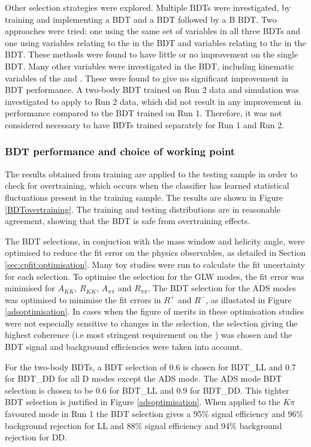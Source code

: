 Other selection strategies were explored. Multiple BDTs were investigated, by training and implementing a \KS BDT and a \Dz BDT followed by a B BDT. Two approaches were tried: one using the same set of variables in all three BDTs and one using variables relating to the \KS in the \KS BDT and variables relating to the \Dz in the \Dz BDT. These methods were found to have little or no improvement on the single BDT. Many other variables were investigated in the BDT, including kinematic variables of the \B and \D. These were found to give no significant improvement in BDT performance. A two-body BDT trained on Run 2 data and simulation was investigated to apply to Run 2 data, which did not result in any improvement in performance compared to the BDT trained on Run 1. Therefore, it was not considered necessary to have BDTs trained separately for Run 1 and Run 2.

\subsubsection{BDT performance and choice of working point}

The results obtained from training are applied to the testing sample in order to check for overtraining, which occurs when the classifier has learned statistical fluctuations present in the training sample. The results are shown in Figure \ref{BDTovertraining}. The training and testing distributions are in reasonable agreement, showing that the BDT is safe from overtraining effects.

The BDT selections, in conjuction with the \Kstarm mass window and \KS helicity angle, were optimised to reduce the fit error on the physics observables, as detailed in Section \ref{sec:cpfit:optimisation}. Many toy studies were run to calculate the fit uncertainty for each selection. To optimise the selection for the GLW modes, the fit error was minimised for $A_{KK}$, $R_{KK}$, $A_{\pi\pi}$ and $R_{\pi\pi}$. The BDT selection for the ADS modes was optimised to minimise the fit errors in $R^+$ and $R^-$, as illustated in Figure \ref{adsoptimisation}. In cases when the figure of merits in these optimisation studies were not especially sensitive to changes in the selection, the selection giving the highest coherence (i.e most stringent requirement on the \Kstarm) was chosen and the BDT signal and background efficiencies were taken into account.

For the two-body BDTs, a BDT selection of 0.6 is chosen for BDT\_LL and 0.7 for BDT\_DD for all D modes except the ADS mode. The ADS mode BDT selection is chosen to be 0.6 for BDT\_LL and 0.9 for BDT\_DD. This tighter BDT selection is justified in Figure \ref{adsoptimisation}. When applied to the $K\pi$ favoured mode in Run 1 the BDT selection gives a 95\% signal efficiency and 96\% background rejection for LL and 88\% signal efficiency and 94\% background rejection for DD. 


